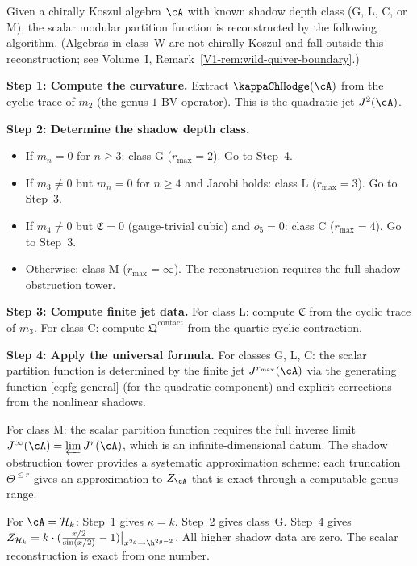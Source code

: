 \begin{construction}
Given a chirally Koszul algebra $\cA$ with known shadow depth class (G, L, C, or M), the
scalar modular partition function is reconstructed by the following algorithm.
(Algebras in class~W are not chirally Koszul and fall outside this
reconstruction; see Volume~I, Remark~\ref*{V1-rem:wild-quiver-boundary}.)

\medskip\noindent\textbf{Step 1: Compute the curvature.}
Extract $\kappaChHodge(\cA)$ from the cyclic trace of $m_2$ (the genus-$1$ BV operator).
This is the quadratic jet $J^2(\cA)$.

\medskip\noindent\textbf{Step 2: Determine the shadow depth class.}
\begin{itemize}
\item If $m_n = 0$ for $n \geq 3$: class G ($r_{\max} = 2$). Go to Step~4.
\item If $m_3 \neq 0$ but $m_n = 0$ for $n \geq 4$ and Jacobi holds: class L
 ($r_{\max} = 3$). Go to Step~3.
\item If $m_4 \neq 0$ but $\mathfrak{C} = 0$ (gauge-trivial cubic) and $o_5 = 0$:
 class C ($r_{\max} = 4$). Go to Step~3.
\item Otherwise: class M ($r_{\max} = \infty$). The reconstruction requires the
 full shadow obstruction tower.
\end{itemize}

\medskip\noindent\textbf{Step 3: Compute finite jet data.}
For class L: compute $\mathfrak{C}$ from the cyclic trace of $m_3$. For class C:
compute $\mathfrak{Q}^{\mathrm{contact}}$ from the quartic cyclic contraction.

\medskip\noindent\textbf{Step 4: Apply the universal formula.}
For classes G, L, C: the scalar partition function is determined by the finite jet
$J^{r_{\max}}(\cA)$ via the generating function \eqref{eq:fg-general} (for the
quadratic component) and explicit corrections from the nonlinear shadows.

For class M: the scalar partition function requires the full inverse limit
$J^\infty(\cA) = \varprojlim J^r(\cA)$, which is an infinite-dimensional datum.
The shadow obstruction tower provides a systematic approximation scheme: each truncation
$\Theta^{\leq r}$ gives an approximation to $Z_\cA$ that is exact through a
computable genus range.
\end{construction}

\begin{proposition}
For $\cA = \mathcal{H}_k$: Step~1 gives $\kappa = k$. Step~2 gives class~G.
Step~4 gives $Z_{\mathcal{H}_k} = k \cdot (\frac{x/2}{\sin(x/2)} - 1)\big|_{x^{2g} \to \h^{2g-2}}$.
All higher shadow data are zero. The scalar reconstruction is exact from one number.
\end{proposition}

